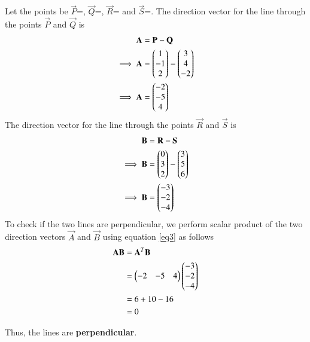 Let the points be $\vec{P}$=, $\vec{Q}$=, $\vec{R}$= and $\vec{S}$=.
The direction vector for the line through the points $\vec{P}$ and $\vec{Q}$ is
\begin{align}
\mathbf{A} &= \mathbf{P}-\mathbf{Q} \\
\implies\mathbf{A} & = \begin{pmatrix} 1 \\ -1 \\ 2 \end{pmatrix} - \begin{pmatrix} 3 \\ 4 \\ -2\end{pmatrix} \\
\implies\mathbf{A} &= \begin{pmatrix} -2 \\ -5 \\ 4\end{pmatrix}
\end{align}
The direction vector for the line through the points $\vec{R}$ and $\vec{S}$ is
\begin{align}
\mathbf{B} &= \mathbf{R}-\mathbf{S} \\
\implies\mathbf{B} & = \begin{pmatrix} 0 \\ 3 \\ 2 \end{pmatrix} - \begin{pmatrix} 3 \\ 5 \\ 6\end{pmatrix} \\
\implies\mathbf{B} &= \begin{pmatrix} -3 \\ -2 \\ -4\end{pmatrix}\\
\end{align}
To check if the two lines are perpendicular, we perform scalar product of the two direction vectors $\vec{A}$ and $\vec{B}$ using equation \ref{eq3} as follows
\begin{align}
\mathbf{A}\mathbf{B} &=  \mathbf{A}^T\mathbf{B}\\
&= \begin{pmatrix} -2 & -5 & 4\end{pmatrix}\begin{pmatrix} -3 \\ -2 \\ -4\end{pmatrix}\\
&= 6+10-16\\
&= 0
\end{align}

Thus, the lines are \textbf{perpendicular}. 
